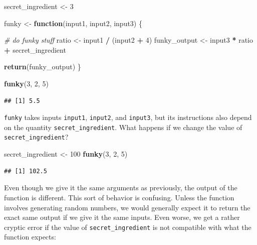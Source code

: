 \documentclass[
]{book}
\newenvironment{Shaded}{\begin{snugshade}}{\end{snugshade}}
\newcommand{\CommentTok}[1]{\textcolor[rgb]{0.56,0.35,0.01}{\textit{#1}}}
\newcommand{\ControlFlowTok}[1]{\textcolor[rgb]{0.13,0.29,0.53}{\textbf{#1}}}
\newcommand{\DecValTok}[1]{\textcolor[rgb]{0.00,0.00,0.81}{#1}}
\newcommand{\FunctionTok}[1]{\textcolor[rgb]{0.13,0.29,0.53}{\textbf{#1}}}
\newcommand{\NormalTok}[1]{#1}
\newcommand{\OtherTok}[1]{\textcolor[rgb]{0.56,0.35,0.01}{#1}}
\newcommand{\SpecialCharTok}[1]{\textcolor[rgb]{0.81,0.36,0.00}{\textbf{#1}}}
\begin{document}
\begin{Shaded}
\begin{Highlighting}[]
\NormalTok{secret\_ingredient }\OtherTok{\textless{}{-}} \DecValTok{3}

\NormalTok{funky }\OtherTok{\textless{}{-}} \ControlFlowTok{function}\NormalTok{(input1, input2, input3) \{}
  
  \CommentTok{\# do funky stuff}
\NormalTok{  ratio }\OtherTok{\textless{}{-}}\NormalTok{ input1 }\SpecialCharTok{/}\NormalTok{ (input2 }\SpecialCharTok{+} \DecValTok{4}\NormalTok{)}
\NormalTok{  funky\_output }\OtherTok{\textless{}{-}}\NormalTok{ input3 }\SpecialCharTok{*}\NormalTok{ ratio }\SpecialCharTok{+}\NormalTok{ secret\_ingredient}
  
  \FunctionTok{return}\NormalTok{(funky\_output)  }
\NormalTok{\}}

\FunctionTok{funky}\NormalTok{(}\DecValTok{3}\NormalTok{, }\DecValTok{2}\NormalTok{, }\DecValTok{5}\NormalTok{)}
\end{Highlighting}
\end{Shaded}

\begin{verbatim}
## [1] 5.5
\end{verbatim}

\texttt{funky} takes inputs \texttt{input1}, \texttt{input2}, and \texttt{input3}, but its instructions also depend on the quantity \texttt{secret\_ingredient}.
What happens if we change the value of \texttt{secret\_ingredient}?

\begin{Shaded}
\begin{Highlighting}[]
\NormalTok{secret\_ingredient }\OtherTok{\textless{}{-}} \DecValTok{100}
\FunctionTok{funky}\NormalTok{(}\DecValTok{3}\NormalTok{, }\DecValTok{2}\NormalTok{, }\DecValTok{5}\NormalTok{)}
\end{Highlighting}
\end{Shaded}

\begin{verbatim}
## [1] 102.5
\end{verbatim}

Even though we give it the same arguments as previously, the output of the function is different.
This sort of behavior is confusing.
Unless the function involves generating random numbers, we would generally expect it to return the exact same output if we give it the same inputs.
Even worse, we get a rather cryptic error if the value of \texttt{secret\_ingredient} is not compatible with what the function expects:
\end{document}
